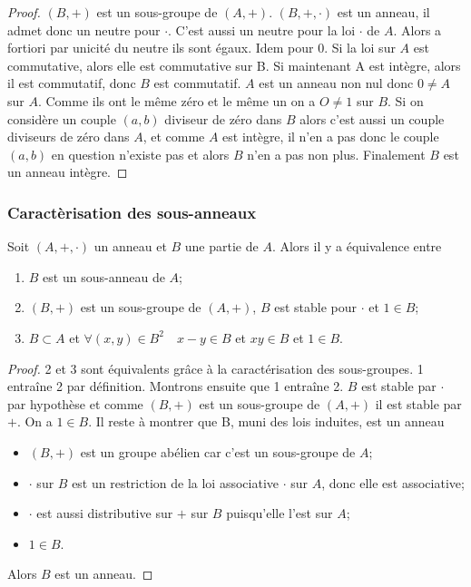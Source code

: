 \begin{proof}
  $(B,+)$ est un sous-groupe de $(A,+)$. $(B,+,\cdot)$ est un anneau, il admet donc un neutre pour $\cdot$. C'est aussi un neutre pour la loi $\cdot$ de $A$. Alors a fortiori par unicité du neutre ils sont égaux. Idem pour $0$. Si la loi sur $A$ est commutative, alors elle est commutative sur B. Si maintenant A est intègre, alors il est commutatif, donc $B$ est commutatif. $A$ est un anneau non nul donc $0 \neq A$ sur $A$. Comme ils ont le même zéro et le même un on a $O \neq 1$ sur $B$. Si on considère un couple $(a,b)$ diviseur de zéro dans $B$ alors c'est aussi un couple diviseurs de zéro dans $A$, et comme $A$ est intègre, il n'en a pas donc le couple $(a,b)$ en question n'existe pas et alors $B$ n'en a pas non plus. Finalement $B$ est un anneau intègre.
\end{proof}

\subsubsection{Caractèrisation des sous-anneaux}

\begin{theo}
  Soit $(A,+,\cdot)$ un anneau et $B$ une partie de $A$. Alors il y a équivalence entre
  \begin{enumerate}
  \item $B$ est un sous-anneau de $A$;
  \item $(B,+)$ est un sous-groupe de $(A,+)$, $B$ est stable pour $\cdot$ et $1 \in B$;
  \item $B \subset A$ et $\forall (x,y) \in B^2 \quad x-y \in B$  et  $xy \in B$ et $1 \in B$.
  \end{enumerate}
\end{theo}
\begin{proof}
  2 et 3 sont équivalents grâce à la caractérisation des sous-groupes. 1 entraîne 2 par définition. Montrons ensuite que 1 entraîne 2. $B$ est stable par $\cdot$ par hypothèse et comme $(B,+)$ est un sous-groupe de $(A,+)$ il est stable par $+$. On a $1 \in B$. Il reste à montrer que B, muni des lois induites, est un anneau
  \begin{itemize}
  \item $(B,+)$ est un groupe abélien car c'est un sous-groupe de $A$;
  \item $\cdot$ sur $B$ est un restriction de la loi associative $\cdot$ sur $A$, donc elle est associative;
  \item $\cdot$ est aussi distributive sur $+$ sur $B$ puisqu'elle l'est sur $A$;
  \item $1 \in B$.
  \end{itemize}
  Alors $B$ est un anneau.
\end{proof}

